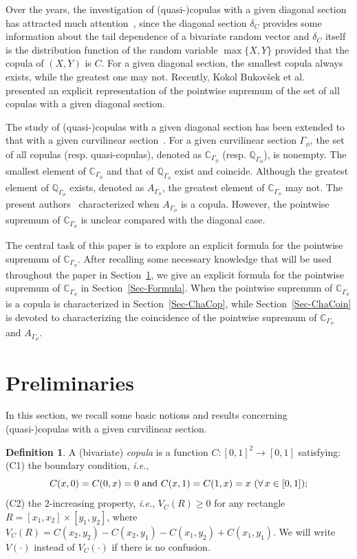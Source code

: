 \documentclass[12pt]{article}
\theoremstyle{plain}
\theoremstyle{definition}
\newtheorem{dfnt}[thrm]{Definition}%
\begin{document}
Over the years, the investigation of (quasi-)copulas with a given diagonal section has attracted much attention~\cite{DJ08,NQRU04,NQRU08}, since the diagonal section $\delta_C$ provides some information about the tail dependence of a bivariate random vector and $\delta_C$ itself is the distribution function of the random variable $\max\{X, Y\}$ provided that the copula of $(X, Y)$ is $C$. For a given diagonal section, the smallest copula always exists, while the greatest one may not. Recently,  Kokol Bukov\v{s}ek et al.~\cite{KMS24} presented an explicit representation of the pointwise supremum of the set of all copulas with a given diagonal section.

The study of (quasi-)copulas with a given diagonal section has been extended to that with a given curvilinear section~\cite{BMJ19}.
For a given curvilinear section $\Gamma_\phi$, the set of all copulas (resp. quasi-copulas), denoted as $\mathbb{C}_{\Gamma_\phi}$ (resp. $\mathbb{Q}_{\Gamma_\phi}$), is nonempty. The smallest element of $\mathbb{C}_{\Gamma_\phi}$ and that of $\mathbb{Q}_{\Gamma_\phi}$ exist and coincide. Although the greatest element of $\mathbb{Q}_{\Gamma_\phi}$ exists, denoted as $A_{\Gamma_\phi}$, the greatest element of $\mathbb{C}_{\Gamma_\phi}$ may not.
The present authors~\cite{OSZ25} characterized when $A_{\Gamma_\phi}$ is a copula. However, the pointwise supremum of $\mathbb{C}_{\Gamma_\phi}$ is unclear compared with the diagonal case.

The central task of this paper is to explore an explicit formula for the pointwise supremum of $\mathbb{C}_{\Gamma_\phi}$.
After recalling some necessary knowledge that will be used throughout the paper in Section~\ref{Sec-Preliminaries}, we give an explicit formula for the pointwise supremum of $\mathbb{C}_{\Gamma_\phi}$ in Section~\ref{Sec-Formula}. When the pointwise supremum of $\mathbb{C}_{\Gamma_\phi}$ is a copula is characterized in Section~\ref{Sec-ChaCop}, while Section~\ref{Sec-ChaCoin} is devoted to characterizing the coincidence of the pointwise supremum of $\mathbb{C}_{\Gamma_\phi}$ and $A_{\Gamma_\phi}$.

\section{Preliminaries}\label{Sec-Preliminaries}

In this section, we recall some basic notions and results concerning (quasi-)copulas with a given curvilinear section.
\begin{dfnt}\cite{N06}
A (bivariate) \emph{copula} is a function $C: [0, 1]^2\to [0, 1]$ satisfying:\\
(C1) the boundary condition, \emph{i.e.},
 \[
 C(x, 0)=C(0, x)=0\ {\rm and} \ C(x, 1)=C(1, x)=x\ (\forall\,x\in [0, 1]);
 \]
(C2) the $2$-increasing property, \emph{i.e.},
$V_C(R)\geq 0$ for any rectangle $R=[x_1, x_2]\times [y_1, y_2]$,
where $V_C(R)=C(x_2, y_2)-C(x_2, y_1)-C(x_1, y_2)+C(x_1, y_1)$. We will write $V(\cdot)$ instead of $V_C(\cdot)$ if there is no confusion.
\end{dfnt}
\end{document}
